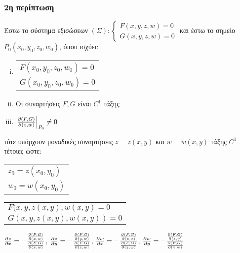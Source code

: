 \subsubsection{2η περίπτωση}

Έστω το σύστημα εξισώσεων $(\Sigma):
\begin{cases}
    F(x,y,z,w) = 0  \\
    G(x,y,z,w) = 0
\end{cases}$
και έστω το σημείο $ P_0(x_0,y_0,z_0,w_0) $, όπου ισχύει:
\begin{enumerate}[(i)]
    \item  \begin{tabular}{l}
            $F(x_0,y_0,z_0,w_0) = 0$ \\
            $G(x_0,y_0,z_0,w_0) = 0$
        \end{tabular}
    \item Οι συναρτήσεις $ F, G $ είναι $ C^{1} $ τάξης 
    \item $ \left.\pdv{(F,G)}{(z,w)}\right|_{P_0} \neq 0 $ 
\end{enumerate}
τότε υπάρχουν μοναδικές συναρτήσεις $ z = z(x,y) $ και $ w = w(x,y) $ τάξης 
$ C^{1} $ τέτοιες ώστε:
\begin{myitemize}
    \item \begin{tabular}{l}
            $ z_0 = z(x_0,y_0) $ \\
            $ w_0 = w(x_0,y_0) $
        \end{tabular}
    \item \begin{tabular}{l}
            $ F(x,y,z(x,y), w(x,y) = 0 $ \\
            $ G(x,y,z(x,y), w(x,y)) = 0 $
        \end{tabular}
    \item $ \pdv{z}{x} = - \frac{\pdv{(F,G)}{(x,w)}}{\pdv{(F,G)}{(x,w)}} $, 
        $ \pdv{z}{y} = -
        \frac{\pdv{(F,G)}{(y,w)}}{\pdv{(F,G)}{(z,w)}} $, $ \pdv{w}{x} = -
        \frac{\pdv{(F,G)}{(z,x)}}{\pdv{(F,G)}{(z,w)}} $, $ \pdv{w}{y} = -
        \frac{\pdv{(F,G)}{(z,y)}}{\pdv{(F,G)}{(z,w)}} $
\end{myitemize}

